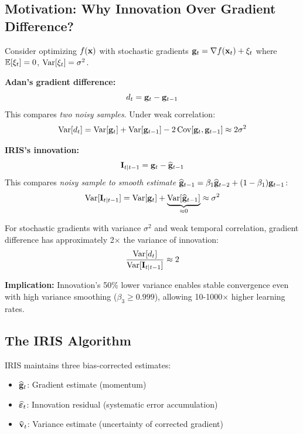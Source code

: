 \subsection{Motivation: Why Innovation Over Gradient Difference?}

Consider optimizing $f(\mathbf{x})$ with stochastic gradients $\mathbf{g}_t = \nabla f(\mathbf{x}_t) + \xi_t$ where $\mathbb{E}[\xi_t] = 0$, $\operatorname{Var}[\xi_t] = \sigma^2$.

\textbf{Adan's gradient difference:}
\begin{equation}
d_t = \mathbf{g}_t - \mathbf{g}_{t-1}
\end{equation}
This compares \emph{two noisy samples}. Under weak correlation:
\begin{equation}
\operatorname{Var}[d_t] = \operatorname{Var}[\mathbf{g}_t] + \operatorname{Var}[\mathbf{g}_{t-1}] - 2\operatorname{Cov}[\mathbf{g}_t, \mathbf{g}_{t-1}] \approx 2\sigma^2
\end{equation}

\textbf{IRIS's innovation:}
\begin{equation}
\mathbf{I}_{t|t-1} = \mathbf{g}_t - \widehat{\mathbf{g}}_{t-1}
\end{equation}
This compares \emph{noisy sample to smooth estimate} $\widehat{\mathbf{g}}_{t-1} = \beta_1 \widehat{\mathbf{g}}_{t-2} + (1-\beta_1)\mathbf{g}_{t-1}$:
\begin{equation}
\operatorname{Var}[\mathbf{I}_{t|t-1}] = \operatorname{Var}[\mathbf{g}_t] + \underbrace{\operatorname{Var}[\widehat{\mathbf{g}}_{t-1}]}_{\approx 0} \approx \sigma^2
\end{equation}

\begin{proposition}
\label{prop:variance}
For stochastic gradients with variance $\sigma^2$ and weak temporal correlation, gradient difference has approximately 2$\times$ the variance of innovation:
\begin{equation}
\frac{\operatorname{Var}[d_t]}{\operatorname{Var}[\mathbf{I}_{t|t-1}]} \approx 2
\end{equation}
\end{proposition}

\textbf{Implication:} Innovation's 50\% lower variance enables stable convergence even with high variance smoothing ($\beta_3 \geq 0.999$), allowing 10-1000$\times$ higher learning rates.

\subsection{The IRIS Algorithm}

IRIS maintains three bias-corrected estimates:
\begin{itemize}
    \item $\widehat{\mathbf{g}}_t$: Gradient estimate (momentum)
    \item $\widehat{\bm{\varepsilon}}_t$: Innovation residual (systematic error accumulation)
    \item $\widehat{\mathbf{v}}_t$: Variance estimate (uncertainty of corrected gradient)
\end{itemize}

